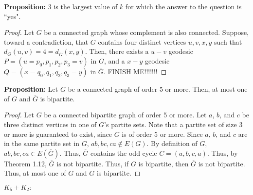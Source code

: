 \documentclass[12pt]{article}
\begin{document}
\medskip
{\bf Proposition:} 3 is the largest value of $k$ for which the answer to the question is ``yes".
\begin{proof}
    Let $G$ be a connected graph whose complement is also connected.
    Suppose, toward a contradiction, that $G$ contains four distinct vertices $u,v,x,y$ such that $d_G(u,v) = 4 = d_{\overline{G}}(x,y)$.
    Then, there exists a $u-v$ geodesic $P = (u = p_0, p_1, p_2, p_3 = v)$ in $G$, and a $x-y$ geodesic $Q = (x = q_0, q_1, q_2, q_3 = y)$ in $\overline G$.
    FINISH ME!!!!!!!
\end{proof}

\bigskip
{}

{\bf Proposition:} Let $G$ be a connected graph of order 5 or more. Then, at most one of $G$ and $\overline G$ is bipartite.
\begin{proof}
    Let $G$ be a connected bipartite graph of order 5 or more.
    Let $a$, $b$, and $c$ be three distinct vertices in one of $G$'s partite sets.
    Note that a partite set of size 3 or more is guaranteed to exist, since $G$ is of order 5 or more.
    Since $a$, $b$, and $c$ are in the same partite set in $G$, $ab, bc, ca \notin E(G)$.
    By definition of $\overline{G}$, $ab,bc,ca\in E(\overline{G})$.
    Thus, $\overline G$ contains the odd cycle $C = (a,b,c,a)$.
    Thus, by Theorem 1.12, $\overline{G}$ is not bipartite.
    Thus, if $G$ is bipartite, then $\overline G$ is not bipartite.
    Thus, at most one of $G$ and $\overline G$ is bipartite.
\end{proof}

\bigskip
{}

 $K_5 + K_2:$
\end{document}
